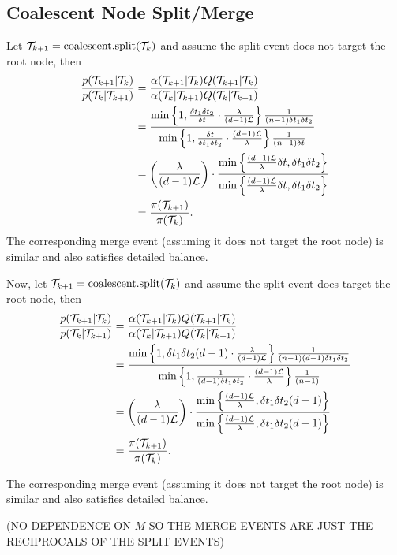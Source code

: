 	\subsection{Coalescent Node Split/Merge}
		Let $\mathcal{T}_{k+1} = \text{coalescent.split} (\mathcal{T}_k)$ and assume the split event does not target the root node, then
			\begin{align*}
				\frac{p(\mathcal{T}_{k+1} | \mathcal{T}_k)}{p(\mathcal{T}_k | \mathcal{T}_{k+1})} & = \frac{\alpha (\mathcal{T}_{k+1} | \mathcal{T}_k) Q(\mathcal{T}_{k+1} | \mathcal{T}_k)}{\alpha(\mathcal{T}_k | \mathcal{T}_{k+1}) Q(\mathcal{T}_k |\mathcal{T}_{k+1})} \\
					& = \frac{\min \left\{ 1, \frac{\delta t_1 \delta t_2}{\delta t} \cdot \frac{\lambda}{(d-1) \mathcal{L}} \right\} \frac{1}{(n-1) \delta t_1 \delta t_2}}{\min \left\{ 1, \frac{\delta t}{\delta t_1 \delta t_2} \cdot \frac{(d-1) \mathcal{L}}{\lambda} \right\} \frac{1}{(n-1) \delta t}} \\
					& = \left( \frac{\lambda}{(d-1) \mathcal{L}}\right) \cdot \frac{\min \left\{\frac{(d-1) \mathcal{L}}{\lambda} \delta t, \delta t_1 \delta t_2 \right\}}{\min \left\{\frac{(d-1) \mathcal{L}}{\lambda} \delta t, \delta t_1 \delta t_2 \right\}} \\
					& = \frac{\pi (\mathcal{T}_{k+1})}{\pi (\mathcal{T}_k)}.
			\end{align*}
		The corresponding merge event (assuming it does not target the root node) is similar and also satisfies detailed balance.
		
		Now, let $\mathcal{T}_{k+1} = \text{coalescent.split} (\mathcal{T}_k)$ and assume the split event does target the root node, then
			\begin{align*}
				\frac{p(\mathcal{T}_{k+1} | \mathcal{T}_k)}{p(\mathcal{T}_k | \mathcal{T}_{k+1})} & = \frac{\alpha (\mathcal{T}_{k+1} | \mathcal{T}_k) Q(\mathcal{T}_{k+1} | \mathcal{T}_k)}{\alpha(\mathcal{T}_k | \mathcal{T}_{k+1}) Q(\mathcal{T}_k |\mathcal{T}_{k+1})} \\
				& = \frac{\min \left\{ 1, \delta t_1 \delta t_2 (d-1) \cdot \frac{\lambda}{(d-1) \mathcal{L}} \right\} \frac{1}{(n-1)(d-1) \delta t_1 \delta t_2}}{\min \left\{ 1, \frac{1}{(d-1)\delta t_1 \delta t_2} \cdot \frac{(d-1) \mathcal{L}}{\lambda} \right\} \frac{1}{(n-1)}} \\
				& = \left( \frac{\lambda}{(d-1) \mathcal{L}}\right) \cdot \frac{\min \left\{\frac{(d-1) \mathcal{L}}{\lambda}, \delta t_1 \delta t_2 (d-1) \right\}}{\min \left\{\frac{(d-1) \mathcal{L}}{\lambda} , \delta t_1 \delta t_2 (d-1) \right\}} \\
				& = \frac{\pi (\mathcal{T}_{k+1})}{\pi (\mathcal{T}_k)}.
			\end{align*}
		
		The corresponding merge event (assuming it does not target the root node) is similar and also satisfies detailed balance.
		
		(NO DEPENDENCE ON $M$ SO THE MERGE EVENTS ARE JUST THE RECIPROCALS OF THE SPLIT EVENTS)